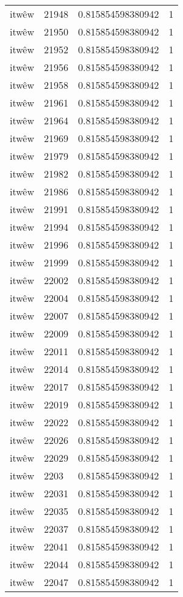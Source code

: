 \begin{longtable}{llll}
itwêw & 21948 & 0.815854598380942 & 1 \\
itwêw & 21950 & 0.815854598380942 & 1 \\
itwêw & 21952 & 0.815854598380942 & 1 \\
itwêw & 21956 & 0.815854598380942 & 1 \\
itwêw & 21958 & 0.815854598380942 & 1 \\
itwêw & 21961 & 0.815854598380942 & 1 \\
itwêw & 21964 & 0.815854598380942 & 1 \\
itwêw & 21969 & 0.815854598380942 & 1 \\
itwêw & 21979 & 0.815854598380942 & 1 \\
itwêw & 21982 & 0.815854598380942 & 1 \\
itwêw & 21986 & 0.815854598380942 & 1 \\
itwêw & 21991 & 0.815854598380942 & 1 \\
itwêw & 21994 & 0.815854598380942 & 1 \\
itwêw & 21996 & 0.815854598380942 & 1 \\
itwêw & 21999 & 0.815854598380942 & 1 \\
itwêw & 22002 & 0.815854598380942 & 1 \\
itwêw & 22004 & 0.815854598380942 & 1 \\
itwêw & 22007 & 0.815854598380942 & 1 \\
itwêw & 22009 & 0.815854598380942 & 1 \\
itwêw & 22011 & 0.815854598380942 & 1 \\
itwêw & 22014 & 0.815854598380942 & 1 \\
itwêw & 22017 & 0.815854598380942 & 1 \\
itwêw & 22019 & 0.815854598380942 & 1 \\
itwêw & 22022 & 0.815854598380942 & 1 \\
itwêw & 22026 & 0.815854598380942 & 1 \\
itwêw & 22029 & 0.815854598380942 & 1 \\
itwêw & 2203 & 0.815854598380942 & 1 \\
itwêw & 22031 & 0.815854598380942 & 1 \\
itwêw & 22035 & 0.815854598380942 & 1 \\
itwêw & 22037 & 0.815854598380942 & 1 \\
itwêw & 22041 & 0.815854598380942 & 1 \\
itwêw & 22044 & 0.815854598380942 & 1 \\
itwêw & 22047 & 0.815854598380942 & 1 \\

\end{longtable}
